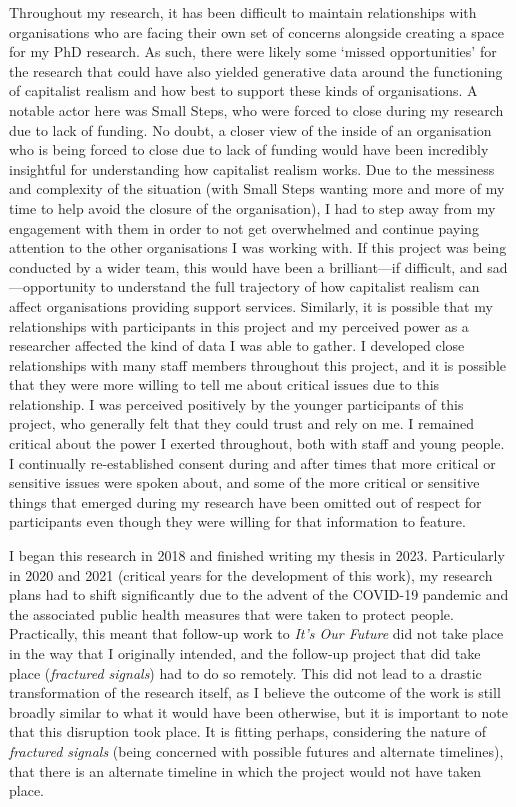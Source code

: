 Throughout my research, it has been difficult to maintain relationships with organisations who are facing their own set of concerns alongside creating a space for my PhD research. As such, there were likely some `missed opportunities' for the research that could have also yielded generative data around the functioning of capitalist realism and how best to support these kinds of organisations. A notable actor here was Small Steps, who were forced to close during my research due to lack of funding. No doubt, a closer view of the inside of an organisation who is being forced to close due to lack of funding would have been incredibly insightful for understanding how capitalist realism works. Due to the messiness and complexity of the situation (with Small Steps wanting more and more of my time to help avoid the closure of the organisation), I had to step away from my engagement with them in order to not get overwhelmed and continue paying attention to the other organisations I was working with. If this project was being conducted by a wider team, this would have been a brilliant—if difficult, and sad—opportunity to understand the full trajectory of how capitalist realism can affect organisations providing support services. Similarly, it is possible that my relationships with participants in this project and my perceived power as a researcher affected the kind of data I was able to gather. I developed close relationships with many staff members throughout this project, and it is possible that they were more willing to tell me about critical issues due to this relationship. I was perceived positively by the younger participants of this project, who generally felt that they could trust and rely on me. I remained critical about the power I exerted throughout, both with staff and young people. I continually re-established consent during and after times that more critical or sensitive issues were spoken about, and some of the more critical or sensitive things that emerged during my research have been omitted out of respect for participants even though they were willing for that information to feature.

I began this research in 2018 and finished writing my thesis in 2023. Particularly in 2020 and 2021 (critical years for the development of this work), my research plans had to shift significantly due to the advent of the COVID-19 pandemic and the associated public health measures that were taken to protect people. Practically, this meant that follow-up work to \textit{It's Our Future} did not take place in the way that I originally intended, and the follow-up project that did take place (\textit{fractured signals}) had to do so remotely. This did not lead to a drastic transformation of the research itself, as I believe the outcome of the work is still broadly similar to what it would have been otherwise, but it is important to note that this disruption took place. It is fitting perhaps, considering the nature of \textit{fractured signals} (being concerned with possible futures and alternate timelines), that there is an alternate timeline in which the project would not have taken place.

